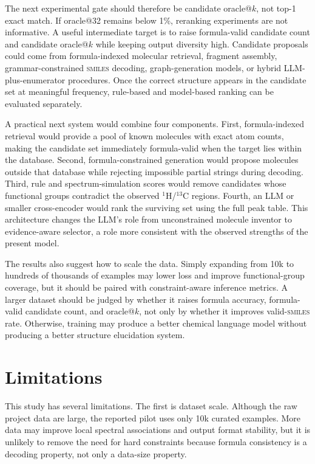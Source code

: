\documentclass{article}
\newcommand{\smiles}{\textsc{smiles}}
\begin{document}
The next experimental gate should therefore be candidate oracle@\(k\), not top-1 exact match. If oracle@32 remains below 1\%, reranking experiments are not informative. A useful intermediate target is to raise formula-valid candidate count and candidate oracle@\(k\) while keeping output diversity high. Candidate proposals could come from formula-indexed molecular retrieval, fragment assembly, grammar-constrained \smiles{} decoding, graph-generation models, or hybrid LLM-plus-enumerator procedures. Once the correct structure appears in the candidate set at meaningful frequency, rule-based and model-based ranking can be evaluated separately.

A practical next system would combine four components. First, formula-indexed retrieval would provide a pool of known molecules with exact atom counts, making the candidate set immediately formula-valid when the target lies within the database. Second, formula-constrained generation would propose molecules outside that database while rejecting impossible partial strings during decoding. Third, rule and spectrum-simulation scores would remove candidates whose functional groups contradict the observed \(^{1}\)H/\(^{13}\)C regions. Fourth, an LLM or smaller cross-encoder would rank the surviving set using the full peak table. This architecture changes the LLM's role from unconstrained molecule inventor to evidence-aware selector, a role more consistent with the observed strengths of the present model.

The results also suggest how to scale the data. Simply expanding from 10k to hundreds of thousands of examples may lower loss and improve functional-group coverage, but it should be paired with constraint-aware inference metrics. A larger dataset should be judged by whether it raises formula accuracy, formula-valid candidate count, and oracle@\(k\), not only by whether it improves valid-\smiles{} rate. Otherwise, training may produce a better chemical language model without producing a better structure elucidation system.

\section{Limitations}

This study has several limitations. The first is dataset scale. Although the raw project data are large, the reported pilot uses only 10k curated examples. More data may improve local spectral associations and output format stability, but it is unlikely to remove the need for hard constraints because formula consistency is a decoding property, not only a data-size property.
\end{document}
